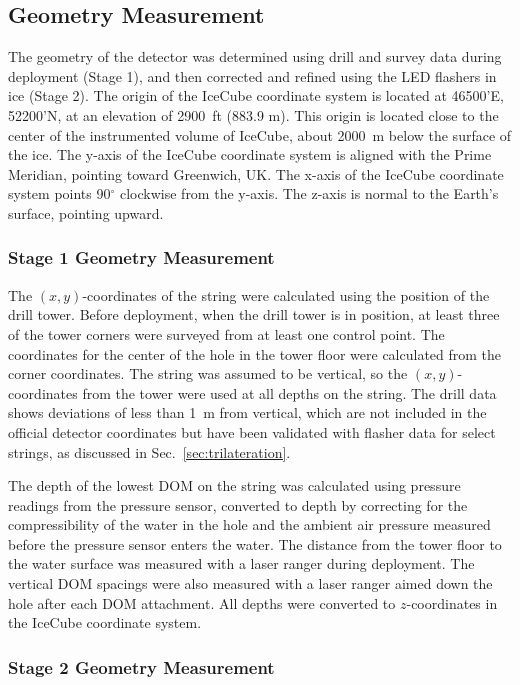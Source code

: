 \subsection{Geometry Measurement}

The geometry of the detector was determined using drill and survey data
during deployment (Stage 1), and then corrected and refined using the LED
flashers in ice (Stage 2). The origin of the IceCube coordinate system
is located at 46500'E, 52200'N, at an elevation of 2900~ft (883.9
m). This origin is located close to the center of the instrumented volume of
IceCube, about 2000~m below the surface of the ice. The y-axis of
the IceCube coordinate system is aligned with the Prime Meridian,
pointing toward Greenwich, UK. The x-axis of the IceCube coordinate
system points 90$^{\circ}$ clockwise from the y-axis. The z-axis is
normal to the Earth's surface, pointing upward. 

\subsubsection{Stage 1 Geometry Measurement}
The $(x,y)$-coordinates of the string were calculated using the position of
the drill tower. Before deployment, when the drill tower is in position, at
least three of the tower corners were surveyed from at least one control
point.  The coordinates for the center of the hole in the tower floor were
calculated from the corner coordinates. The string was assumed to be
vertical, so the $(x,y)$-coordinates from the tower were used at all
depths on the string. The drill
data shows deviations of less than 1~m from vertical, which are not
included in the official detector coordinates but have been validated
with flasher data for select strings, as discussed in Sec.~\ref{sec:trilateration}. 

The depth of the lowest DOM on the string was calculated using pressure
readings from the pressure sensor, converted to depth by correcting for the
compressibility of the water in the hole and the ambient air pressure
measured before the pressure sensor enters the water. The distance from the
tower floor to the water surface was measured with a laser ranger
during deployment. The
vertical DOM spacings were also measured with a laser
ranger aimed down the hole after each DOM attachment. All depths were
converted to $z$-coordinates in the IceCube 
coordinate system.

\subsubsection{Stage 2 Geometry Measurement}


